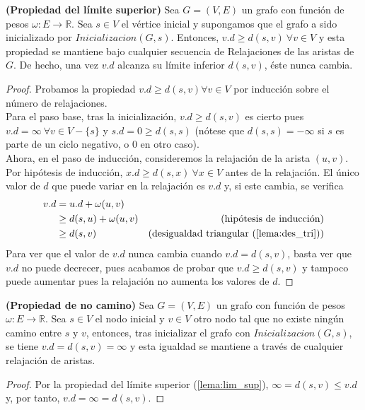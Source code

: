 \begin{lema}\label{lema:lim_sup}
	\textbf{(Propiedad del límite superior)} Sea $G=(V,E)$ un grafo con función de pesos $\omega : E\rightarrow \mathbb{R}$. Sea $s\in V$ el vértice inicial y supongamos que el grafo a sido inicializado por $Inicializacion(G,s)$. Entonces, $v.d \geq d(s,v)\ \forall v\in V$ y esta propiedad se mantiene bajo cualquier secuencia de Relajaciones de las aristas de $G$. De hecho, una vez $v.d$ alcanza su límite inferior $d(s,v)$, éste nunca cambia.
\end{lema}

\begin{proof}
	Probamos la propiedad $v.d \geq d(s,v) \forall v\in V$ por inducción sobre el número de relajaciones. \\
	Para el paso base, tras la inicialización, $v.d \geq d(s,v)$ es cierto pues $v.d = \infty\ \forall v\in V-\{s\}$ y $s.d=0\geq d(s,s)$ (nótese que $d(s,s)=-\infty$ si $s$ es parte de un ciclo negativo, o $0$ en otro caso). \\
	Ahora, en el paso de inducción, consideremos la relajación de la arista $(u,v)$. Por hipótesis de inducción, $x.d\geq d(s,x)\ \forall x\in V$ antes de la relajación. El único valor de $d$ que puede variar en la relajación es $v.d$ y, si este cambia, se verifica
	\begin{align*}
			v.d & =u.d + \omega(u,v) \\
			& \geq d(s,u) + \omega(u,v) & (\textrm{hipótesis de inducción}) \\
			& \geq d(s,v) & (\textrm{desigualdad triangular (\autoref{lema:des_tri})})
	\end{align*}
	Para ver que el valor de $v.d$ nunca cambia cuando $v.d=d(s,v)$, basta ver que $v.d$ no puede decrecer, pues acabamos de probar que $v.d\geq d(s,v)$ y tampoco puede aumentar pues la relajación no aumenta los valores de $d$.
\end{proof}

\begin{corolario}\label{cor:no_path}
	\textbf{(Propiedad de no camino)} Sea $G=(V,E)$ un grafo con función de pesos $\omega : E\rightarrow \mathbb{R}$. Sea $s\in V$ el nodo inicial y $v\in V$ otro nodo tal que no existe ningún camino entre $s$ y $v$, entonces, tras inicializar el grafo con $Inicializacion(G,s)$, se tiene $v.d=d(s,v)=\infty$ y esta igualdad se mantiene a través de cualquier relajación de aristas.
\end{corolario}

\begin{proof}
	Por la propiedad del límite superior (\autoref{lema:lim_sup}), $\infty=d(s,v)\leq v.d$ y, por tanto, $v.d=\infty =d(s,v).$
\end{proof}

